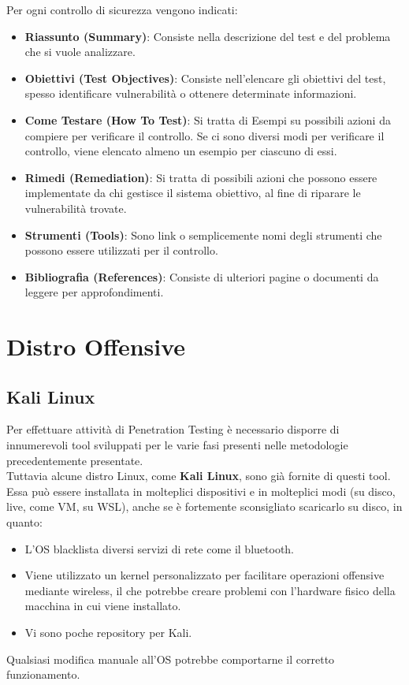 \documentclass{article}
\begin{document}
\newpage
Per ogni controllo di sicurezza vengono indicati:
\begin{itemize}
    \item \textbf{Riassunto (Summary)}: Consiste nella descrizione del test e del problema che si vuole analizzare.
    
    \item \textbf{Obiettivi (Test Objectives)}: Consiste nell'elencare gli obiettivi del test, spesso identificare vulnerabilità o ottenere 
    determinate informazioni.
    
    \item \textbf{Come Testare (How To Test)}: Si tratta di Esempi su possibili azioni da compiere per verificare il controllo. Se ci sono diversi modi per verificare il controllo, viene elencato almeno un 
    esempio per ciascuno di essi.
    
    \item \textbf{Rimedi (Remediation)}: Si tratta di possibili azioni che possono essere implementate da chi gestisce il sistema obiettivo, al fine di riparare le vulnerabilità trovate.
    
    \item \textbf{Strumenti (Tools)}: Sono link o semplicemente nomi degli strumenti che possono essere utilizzati per il controllo.
    
    \item \textbf{Bibliografia (References)}: Consiste di ulteriori pagine o documenti da leggere per approfondimenti.
\end{itemize}

\section{Distro Offensive}
\subsection{Kali Linux}
Per effettuare attività di Penetration Testing è necessario disporre di innumerevoli tool sviluppati per le varie fasi presenti nelle metodologie precedentemente presentate.\\
Tuttavia alcune distro Linux, come \textbf{Kali Linux}, sono già fornite di questi tool. Essa può essere installata in molteplici dispositivi e in molteplici modi (su disco, live, come VM, su WSL), anche se è fortemente sconsigliato scaricarlo su disco, in quanto:
\begin{itemize}
    \item L'OS blacklista diversi servizi di rete come il bluetooth.
    \item Viene utilizzato un kernel personalizzato per facilitare operazioni offensive mediante wireless, il che potrebbe creare 
    problemi con l’hardware fisico della macchina in cui viene installato.
    \item Vi sono poche repository per Kali.
\end{itemize}
Qualsiasi modifica manuale all'OS potrebbe comportarne il corretto funzionamento.
\end{document}
